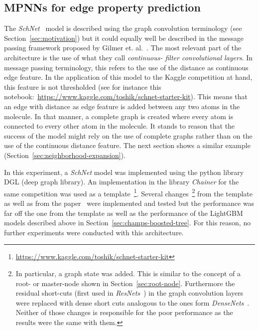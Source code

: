 \subsection{MPNNs for edge property prediction}

The \textit{SchNet}~\cite{Schutt2017} model is described using the graph convolution terminology (see Section~\ref{sec:motivation}) but it could equally well be described in the message passing framework proposed by Gilmer et. al.~\cite{Gilmer2017}. The most relevant part of the architecture is the use of what they call \textit{continuous- filter convolutional layers}. In message passing terminology, this refers to the use of the distance as continuous edge feature. In the application of this model to the Kaggle competition at hand, this feature is not thresholded (see for instance this notebook:~\url{https://www.kaggle.com/toshik/schnet-starter-kit}). This means that an edge with distance as edge feature is added between any two atoms in the molecule. In that manner, a complete graph is created where every atom is connected to every other atom in the molecule. It stands to reason that the success of the model might rely on the use of complete graphs rather than on the use of the continuous distance feature. The next section shows a similar example (Section~\ref{sec:neighborhood-expansion}).

In this experiment, a \textit{SchNet} model was implemented using the python library DGL (deep graph library). An implementation in the library \textit{Chainer} for the same competition was used as a template~\footnote{\url{https://www.kaggle.com/toshik/schnet-starter-kit}}. Several changes~\footnote{\label{fn:chainer-schnet}
	In particular, a graph state was added. This is similar to the concept of a root- or master-node shown in Section~\ref{sec:root-node}. Furthermore the residual short-cuts (first used in \textit{ResNets}~\cite{Sun2016}) in the graph convolution layers were replaced with dense short cuts analogous to the ones form \textit{DenseNets}~\cite{Huang2017}. Neither of those changes is responsible for the poor performance as the results were the same with them.
} from the template as well as from the paper~\cite{Schutt2017} were implemented and tested but the performance was far off the one from the template as well as the performance of the LightGBM models described above in Section~\ref{sec:champs-boosted-tree}. For this reason, no further experiments were conducted with this architecture.

